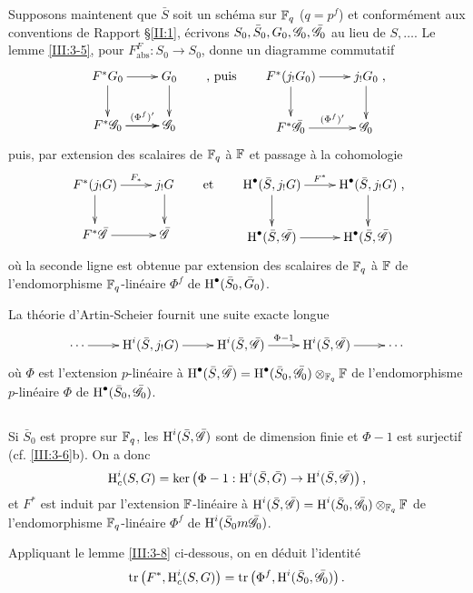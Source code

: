 Supposons maintenent que $\bar S$ soit un sch\'ema sur $\mathbb{F}_q$ ($q=p^f$) et 
conform\'ement aux conventions de Rapport \S\ref{II:1}, \'ecrivons 
$S_0,\bar S_0,G_0,\mathscr{G}_0,\bar{\mathscr{G}}_0$ au lieu de $S,\dots$. Le lemme 
\ref{III:3-5}, pour $F_\text{abs}^F:S_0\to S_0$, donne un diagramme commutatif 
\[\xymatrix{
  F^* G_0 \ar[r] \ar[d] 
    & G_0 \ar[d] \\
  F^*\cG_0 \ar[r]^-{(\Phi^f)'} \ar[r] 
    & \cG_0 
}\qquad\text{, puis}\qquad 
\xymatrix{
  F^*(j_! G_0) \ar[r] \ar[d] 
    & j_!G_0 \ar[d] \\
  F^*\bar\cG_0 \ar[r]^-{(\Phi^f)'}
    & \cG_0
}\text{,}
\]
puis, par extension des scalaires de $\mathbb{F}_q$ \`a $\mathbb{F}$ et passage \`a la 
cohomologie 
\[\xymatrix{
  F^*(j_! G) \ar[r]^-{F_*} \ar[d] 
    & j_!G \ar[d] \\
  F^*\bar\cG \ar[r]
    & \bar\cG
}\qquad\text{et}\qquad 
\xymatrix{
  \h^\bullet(\bar S,j_! G) \ar[r]^-{F^*} \ar[d] 
    & \h^\bullet(\bar S,j_!G) \ar[d] \\
  \h^\bullet(\bar S,\bar\cG) \ar[r]
    & \h^\bullet(\bar S,\bar\cG)
}\text{,}
\]
o\`u la seconde ligne est obtenue par extension des scalaires de $\mathbb{F}_q$ \`a 
$\mathbb{F}$ de l'endomorphisme $\mathbb{F}_q$-lin\'eaire $\Phi^f$ de 
$\operatorname{H}^\bullet(\bar S_0,\bar G_0)$. 

La th\'eorie d'Artin-Scheier fournit une suite exacte longue 
\[\xymatrix{
  \cdots \ar[r]
    & \h^i(\bar S,j_! G) \ar[r]
    & \h^i(\bar S,\bar\cG) \ar[r]^-{\Phi-1}
    & \h^i(\bar S,\bar\cG) \ar[r]
    & \cdots
}\]
o\`u $\Phi$ est l'extension $p$-lin\'eaire \`a 
$\operatorname{H}^\bullet(\bar S,\bar {\mathscr{G}})= \operatorname{H}^\bullet(\bar S_0,\bar{\mathscr{G}}_0)\otimes_{\mathbb{F}_q}\mathbb{F}$ 
de l'endomorphisme $p$-lin\'eaire $\Phi$ de $\operatorname{H}^\bullet(\bar S_0,\bar{\mathscr{G}}_0)$. 





\subsection{}\label{III:3-7}

Si $\bar S_0$ est propre sur $\mathbb{F}_q$, les $\operatorname{H}^i(\bar S,\bar{\mathscr{G}})$ sont de 
dimension finie et $\Phi-1$ est surjectif (cf. \ref{III:3-6}b). On a donc 
\[
  \operatorname{H}_c^i(S,G) = \ker\left(\Phi-1 : \operatorname{H}^i(\bar S,\bar G) \to \operatorname{H}^i(\bar S,\bar{\mathscr{G}})\right) \text{,}
\]
et $F^*$ est induit par l'extension $\mathbb{F}$-lin\'eaire \`a 
$\operatorname{H}^i(\bar S,\bar{\mathscr{G}}) = \operatorname{H}^i(\bar S_0,\bar{\mathscr{G}}_0)\otimes_{\mathbb{F}_q}\mathbb{F}$ de 
l'endomorphisme $\mathbb{F}_q$-lin\'eaire $\Phi^f$ de $\operatorname{H}^i(\bar S_0m\bar{\mathscr{G}}_0)$. 

Appliquant le lemme \ref{III:3-8} ci-dessous, on en d\'eduit l'identit\'e 
\begin{equation}\label{III:eq:3-7-1}
  \operatorname{tr}\left(F^*,\operatorname{H}_c^i(S,G)\right) = \operatorname{tr}\left(\Phi^f,\operatorname{H}^i(\bar S_0,\bar{\mathscr{G}}_0)\right) \text{.}
\end{equation}





